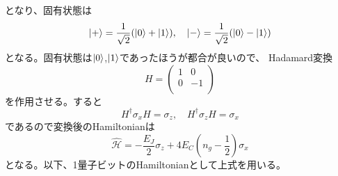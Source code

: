         となり、固有状態は
        \begin{equation}
            \ket{+}=\frac{1}{\sqrt2}(\ket{0}+\ket{1}),\quad \ket{-}=\frac{1}{\sqrt2}(\ket{0}-\ket{1})
        \end{equation}
        となる。固有状態は$\ket{0}$,$\ket{1}$であったほうが都合が良いので、
        Hadamard変換
        \begin{equation}
            H=\left(
            \begin{array}{cc}
                1 & 0 \\
                0 & -1 \\
            \end{array}
            \right)
        \end{equation}
        を作用させる。すると
        \begin{equation}
        H^\dagger \sigma_x H = \sigma_z, \quad H^\dagger \sigma_z H = \sigma_x
        \end{equation}
        であるので変換後のHamiltonianは
        \begin{equation}
            \hat{\mathcal{H}}=-\frac{E_J}{2}\sigma_z + 4E_C ( n_g-\frac{1}{2} ) \sigma_x
        \end{equation}
        となる。以下、1量子ビットのHamiltonianとして上式を用いる。
